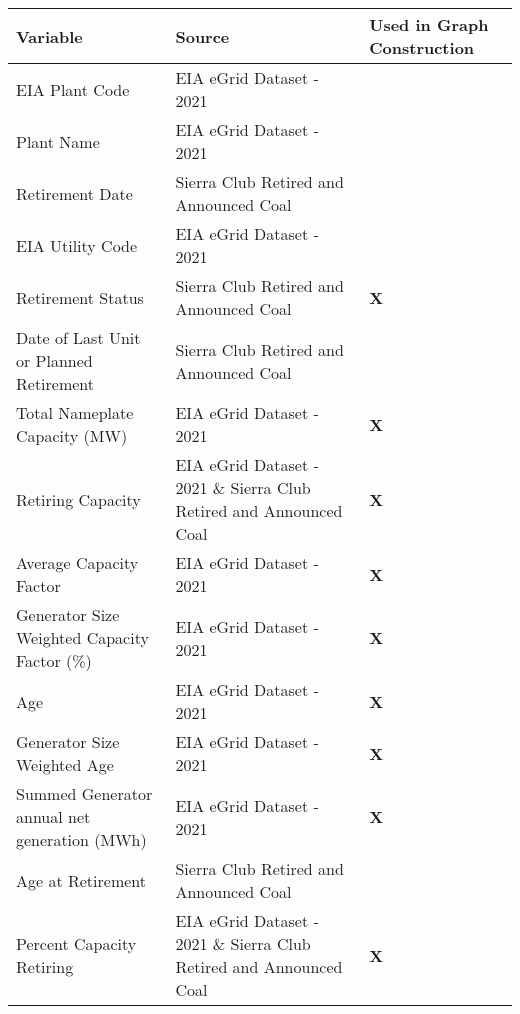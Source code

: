 
\begin{table}[htb]
    \centering
    \small
    \begin{adjustbox}{width=\textwidth}
      \begin{tabular}{|l | l | l |}
        \toprule
        \textbf{Variable} & \textbf{Source} & \textbf{Used in Graph Construction} \\
        \midrule\midrule
        EIA Plant Code & EIA eGrid Dataset - 2021 & \\
        \midrule
        Plant Name & EIA eGrid Dataset - 2021 & \\
        \midrule
        Retirement Date & Sierra Club Retired and Announced Coal & \\
        \midrule
        EIA Utility Code & EIA eGrid Dataset - 2021 & \\
        \midrule
        Retirement Status & Sierra Club Retired and Announced Coal & \textbf{X} \\
        \midrule
        Date of Last Unit or Planned Retirement & Sierra Club Retired and Announced Coal & \\
        \midrule
        Total Nameplate Capacity (MW) & EIA eGrid Dataset - 2021 & \textbf{X} \\
        \midrule
        Retiring Capacity & EIA eGrid Dataset - 2021 \& Sierra Club Retired and Announced Coal & \textbf{X} \\
        \midrule
        Average Capacity Factor & EIA eGrid Dataset - 2021 & \textbf{X} \\
        \midrule
        Generator Size Weighted Capacity Factor (\%) & EIA eGrid Dataset - 2021 & \textbf{X} \\
        \midrule
        Age & EIA eGrid Dataset - 2021 & \textbf{X} \\
        \midrule
        Generator Size Weighted Age & EIA eGrid Dataset - 2021 & \textbf{X} \\
        \midrule
        Summed Generator annual net generation (MWh) & EIA eGrid Dataset - 2021 & \textbf{X} \\
        \midrule
        Age at Retirement & Sierra Club Retired and Announced Coal & \\
        \midrule
        Percent Capacity Retiring & EIA eGrid Dataset - 2021 \& Sierra Club Retired and Announced Coal & \textbf{X} \\

\end{tabular}
\end{adjustbox}
\end{table}

